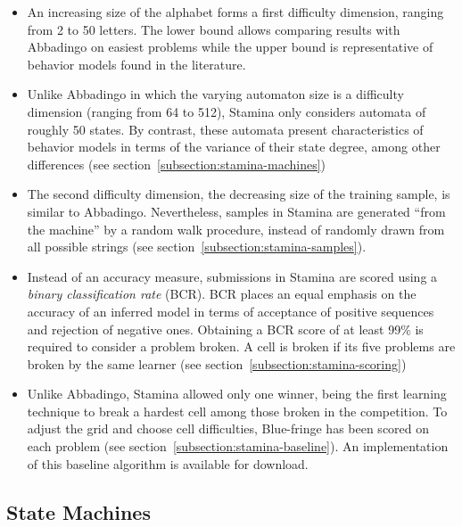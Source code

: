 \begin{itemize}

\item An increasing size of the alphabet forms a first difficulty dimension, ranging from 2 to 50 letters. The lower bound allows comparing results with Abbadingo on easiest problems while the upper bound is representative of behavior models found in the literature.

\item Unlike Abbadingo in which the varying automaton size is a difficulty dimension (ranging from 64 to 512), Stamina only considers automata of roughly 50 states. By contrast, these automata present characteristics of behavior models in terms of the variance of their state degree, among other differences (see section~\ref{subsection:stamina-machines})

\item The second difficulty dimension, the decreasing size of the training sample, is similar to Abbadingo. Nevertheless, samples in Stamina are generated ``from the machine'' by a random walk procedure, instead of randomly drawn from all possible strings (see section~\ref{subsection:stamina-samples}).

\item Instead of an accuracy measure, submissions in Stamina are scored using a \emph{binary classification rate} (BCR). BCR places an equal emphasis on the accuracy of an inferred model in terms of acceptance of positive sequences and rejection of negative ones. Obtaining a BCR score of at least 99\% is required to consider a problem broken. A cell is broken if its five problems are broken by the same learner (see section~\ref{subsection:stamina-scoring})

\item Unlike Abbadingo, Stamina allowed only one winner, being the first learning technique to break a hardest cell among those broken in the competition. To adjust the grid and choose cell difficulties, Blue-fringe has been scored on each problem (see section~\ref{subsection:stamina-baseline}). An implementation of this baseline algorithm is available for download.

\end{itemize}

\subsection{State Machines\label{subsection:stamina-machines}}

